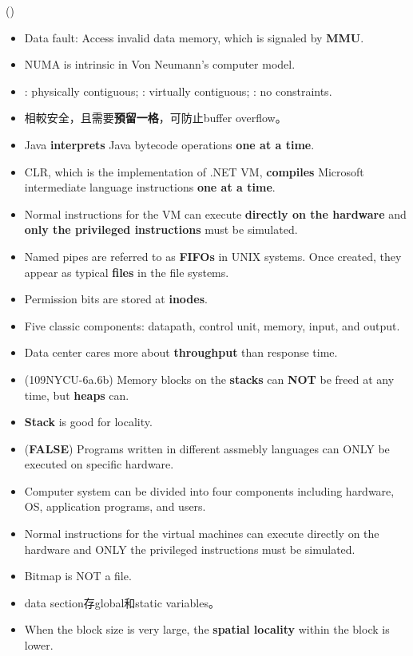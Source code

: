 \begin{theorem}{()} \quad\quad \begin{itemize}
        \item Data fault: Access invalid data memory, which is signaled by \textbf{MMU}.
        \item NUMA is intrinsic in Von Neumann's computer model.
        \item {}: physically contiguous; : virtually contiguous; : no constraints.
        \item {}相較安全，且需要\textbf{預留一格}，可防止buffer overflow。
        \item Java \textbf{interprets} Java bytecode operations \textbf{one at a time}.
        \item CLR, which is the implementation of .NET VM, \textbf{compiles} Microsoft intermediate language instructions \textbf{one at a time}.
        \item Normal instructions for the VM can execute \textbf{directly on the hardware} and \textbf{only the privileged instructions} must be simulated.
        \item Named pipes are referred to as \textbf{FIFOs} in UNIX systems. Once created, they appear as typical \textbf{files} in the file systems. 
        \item Permission bits are stored at \textbf{inodes}.
        \item Five classic components: datapath, control unit, memory, input, and output.
        \item Data center cares more about \textbf{throughput} than response time.
        \item (109NYCU-6a.6b) Memory blocks on the \textbf{stacks} can \textbf{NOT} be freed at any time, but \textbf{heaps} can.
        \item \textbf{Stack} is good for locality.
        \item (\textbf{FALSE}) Programs written in different assmebly languages can ONLY be executed on specific hardware.
        \item Computer system can be divided into four components including hardware, OS, application programs, and users.  
        \item Normal instructions for the virtual machines can execute directly on the hardware and ONLY the privileged instructions must be simulated.
        \item Bitmap is NOT a file.
        \item data section存global和static variables。
        \item When the block size is very large, the \textbf{spatial locality} within the block is lower.
    \end{itemize}
\end{theorem}
